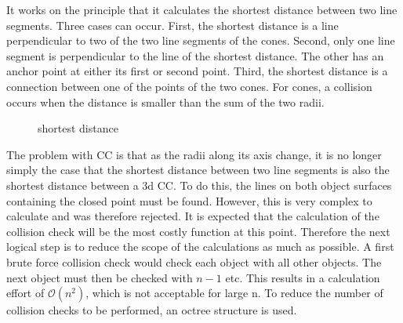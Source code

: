 % 
It works on the principle that it calculates the shortest distance between two line segments.
Three cases can occur.
First, the shortest distance is a line perpendicular to two of the two line segments of the cones.
Second, only one line segment is perpendicular to the line of the shortest distance.
The other has an anchor point at either its first or second point.
Third, the shortest distance is a connection between one of the points of the two cones.
For cones, a collision occurs when the distance is smaller than the sum of the two radii.
\\
\begin{figure}[!t]
    \centering
    \def\tikzheight{0.5\textwidth}
	\caption{shortest distance}
	\label{fig:shortDist}
\end{figure}
% 
The problem with \ac{CC} is that as the radii along its axis change, it is no longer simply the case that the shortest distance between two line segments is also the shortest distance between a 3d \ac{CC}.
To do this, the lines on both object surfaces containing the closed point must be found.
However, this is very complex to calculate and was therefore rejected.
% 
It is expected that the calculation of the collision check will be the most costly function at this point.
Therefore the next logical step is to reduce the scope of the calculations as much as possible.
A first brute force collision check would check each object with all other objects.
The next object must then be checked with $n-1$ etc.
This results in a calculation effort of $\mathcal{O}(n^{2})$, which is not acceptable for large n.
To reduce the number of collision checks to be performed, an octree structure is used.
% 
